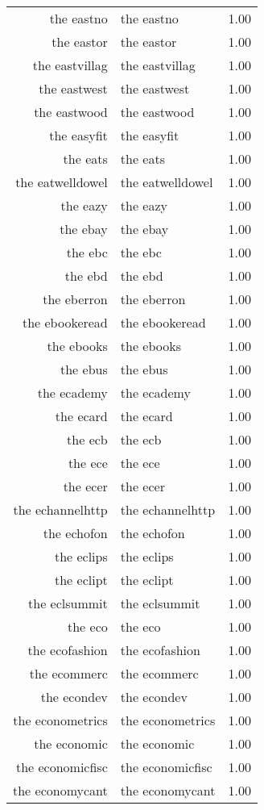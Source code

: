 \begin{table}[ht]
\begin{tabular}{rlr}
  the eastno & the eastno & 1.00 \\ 
  the eastor & the eastor & 1.00 \\ 
  the eastvillag & the eastvillag & 1.00 \\ 
  the eastwest & the eastwest & 1.00 \\ 
  the eastwood & the eastwood & 1.00 \\ 
  the easyfit & the easyfit & 1.00 \\ 
  the eats & the eats & 1.00 \\ 
  the eatwelldowel & the eatwelldowel & 1.00 \\ 
  the eazy & the eazy & 1.00 \\ 
  the ebay & the ebay & 1.00 \\ 
  the ebc & the ebc & 1.00 \\ 
  the ebd & the ebd & 1.00 \\ 
  the eberron & the eberron & 1.00 \\ 
  the ebookeread & the ebookeread & 1.00 \\ 
  the ebooks & the ebooks & 1.00 \\ 
  the ebus & the ebus & 1.00 \\ 
  the ecademy & the ecademy & 1.00 \\ 
  the ecard & the ecard & 1.00 \\ 
  the ecb & the ecb & 1.00 \\ 
  the ece & the ece & 1.00 \\ 
  the ecer & the ecer & 1.00 \\ 
  the echannelhttp & the echannelhttp & 1.00 \\ 
  the echofon & the echofon & 1.00 \\ 
  the eclips & the eclips & 1.00 \\ 
  the eclipt & the eclipt & 1.00 \\ 
  the eclsummit & the eclsummit & 1.00 \\ 
  the eco & the eco & 1.00 \\ 
  the ecofashion & the ecofashion & 1.00 \\ 
  the ecommerc & the ecommerc & 1.00 \\ 
  the econdev & the econdev & 1.00 \\ 
  the econometrics & the econometrics & 1.00 \\ 
  the economic & the economic & 1.00 \\ 
  the economicfisc & the economicfisc & 1.00 \\ 
  the economycant & the economycant & 1.00 \\ 

\end{tabular}
\end{table}
